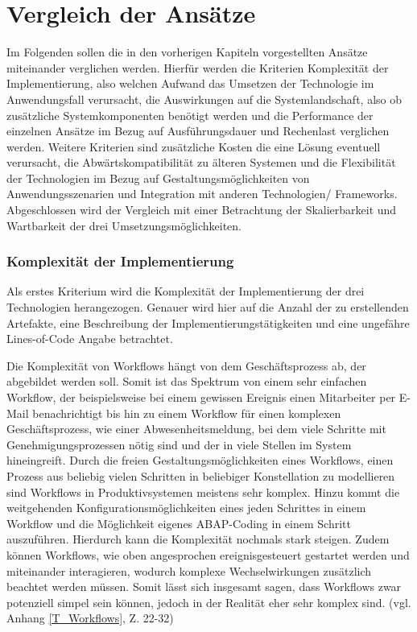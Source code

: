 \section{Vergleich der Ansätze}

Im Folgenden sollen die in den vorherigen Kapiteln vorgestellten Ansätze miteinander verglichen werden. Hierfür werden die Kriterien Komplexität der Implementierung, also welchen Aufwand das Umsetzen der Technologie im Anwendungsfall verursacht, die Auswirkungen auf die Systemlandschaft, also ob zusätzliche Systemkomponenten benötigt werden und die Performance der einzelnen Ansätze im Bezug auf Ausführungsdauer und Rechenlast verglichen werden. Weitere Kriterien sind zusätzliche Kosten die eine Lösung eventuell verursacht, die Abwärtskompatibilität zu älteren Systemen und die Flexibilität der Technologien im Bezug auf Gestaltungsmöglichkeiten von Anwendungsszenarien und Integration mit anderen Technologien/ Frameworks. Abgeschlossen wird der Vergleich mit einer Betrachtung der Skalierbarkeit und Wartbarkeit der drei Umsetzungsmöglichkeiten.

\subsubsection{Komplexität der Implementierung}

Als erstes Kriterium wird die Komplexität der Implementierung der drei Technologien herangezogen. Genauer wird hier auf die Anzahl der zu erstellenden Artefakte, eine  Beschreibung der Implementierungstätigkeiten und eine ungefähre Lines-of-Code Angabe betrachtet.

Die Komplexität von Workflows hängt von dem Geschäftsprozess ab, der abgebildet werden soll. Somit ist das Spektrum von einem sehr einfachen Workflow, der beispielsweise bei einem gewissen Ereignis einen Mitarbeiter per E-Mail benachrichtigt bis hin zu einem Workflow für einen komplexen Geschäftsprozess, wie einer Abwesenheitsmeldung, bei dem viele Schritte mit Genehmigungsprozessen nötig sind und der in viele Stellen im System hineingreift. Durch die freien Gestaltungsmöglichkeiten eines Workflows, einen Prozess aus beliebig vielen Schritten in beliebiger Konstellation zu modellieren sind Workflows in Produktivsystemen meistens sehr komplex. Hinzu kommt die weitgehenden Konfigurationsmöglichkeiten eines jeden Schrittes in einem Workflow und die Möglichkeit eigenes ABAP-Coding in einem Schritt auszuführen. Hierdurch kann die Komplexität nochmals stark steigen. Zudem können Workflows, wie oben angesprochen ereignisgesteuert gestartet werden und miteinander interagieren, wodurch komplexe Wechselwirkungen zusätzlich beachtet werden müssen. Somit lässt sich insgesamt sagen, dass Workflows zwar potenziell simpel sein können, jedoch in der Realität eher sehr komplex sind. (vgl. Anhang \ref{T_Workflows}, Z. 22-32)

